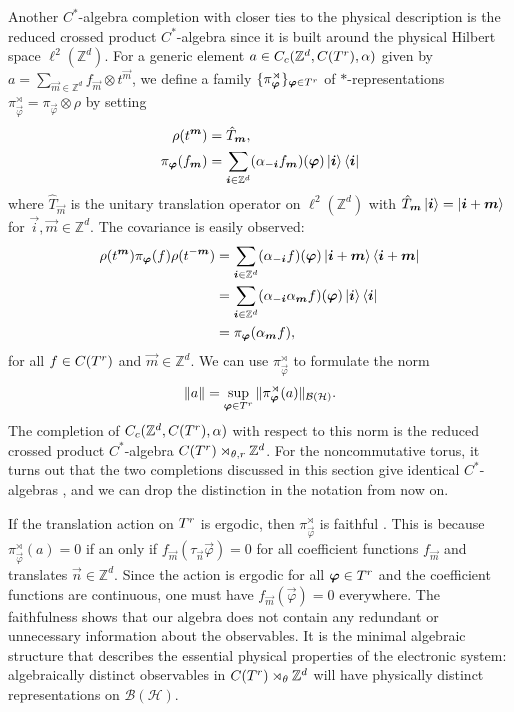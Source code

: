 \documentclass[submission, Phys]{SciPost}
\begin{document}
Another $C^\ast$-algebra completion with closer ties to the physical description is the reduced crossed product $C^\ast$-algebra since it is built around the physical Hilbert space $\ell^2(\mathbb{Z}^d)$.
For a generic element
$a\in C_c(\mathbb{Z}^d, C(T^r), \alpha )$
given by $a=\sum_{\vec{m} \in \mathbb{Z}^d} f_{\vec{m}} \otimes t^{\vec{m}}$,
we define a family $\lbrace \pi_{\boldsymbol{\varphi}}^\rtimes \rbrace_{\boldsymbol{\varphi}\in T^r} $
of $\ast$-representations $\pi_{\vec{\varphi}}^\rtimes = \pi_{\vec{\varphi}} \otimes \rho $ by setting
\begin{align}
    \rho(t^{\boldsymbol{m}}) &= \hat{T}_{\boldsymbol{m}},
    \\ 
    \pi_{\boldsymbol{\varphi}}(f_{\boldsymbol{m}})&=\sum_{\boldsymbol{i} \in \mathbb{Z}^{d}} (\alpha_{-\boldsymbol{i}}f_{\boldsymbol{m}})(\boldsymbol{\varphi})  \ket{\boldsymbol{i}}\bra{\boldsymbol{i}}
\end{align}
where $\hat{T}_{\vec{m}}$ is the unitary translation operator on $\ell^2(\mathbb{Z}^d)$ with $\hat{T}_{\boldsymbol{m}}\ket{\boldsymbol{i}}=\ket{\boldsymbol{i}+\boldsymbol{m}}$ for $\vec{i},\vec{m} \in \mathbb{Z}^d$.
The covariance is easily observed:
\begin{align}
\rho(t^{\boldsymbol{m}})\pi_{\boldsymbol{\varphi}}(f)\rho(t^{-\boldsymbol{m}})
&=\sum_{\boldsymbol{i} \in \mathbb{Z}^{d}} (\alpha_{-\boldsymbol{i}}f)(\boldsymbol{\varphi})  \ket{\boldsymbol{i}+\boldsymbol{m}}\bra{\boldsymbol{i}+\boldsymbol{m}}
\notag \\
&=\sum_{\boldsymbol{i} \in \mathbb{Z}^{d}} (\alpha_{-\boldsymbol{i}} \alpha_{\boldsymbol{m}} f)(\boldsymbol{\varphi})  \ket{\boldsymbol{i}}\bra{\boldsymbol{i}}
\notag \\
&=\pi_{\boldsymbol{\varphi}}(\alpha_{\boldsymbol{m}}f),
\end{align}
for all $f \in C(T^r)$ and $\vec{m} \in \mathbb{Z}^d$.
We can use $\pi_{\vec{\varphi}}^\rtimes$ to formulate the norm
\begin{equation}
    \| a \| = \sup_{\boldsymbol{\varphi}\in T^r} 
    \| \pi_{\boldsymbol{\varphi}}^\rtimes(a) \|_{\mathcal{B}(\mathcal{H})}.
\end{equation}
The completion of $C_c(\mathbb{Z}^d, C(T^r), \alpha )$ with respect to this norm is the reduced crossed product $C^\ast$-algebra $C(T^r)\rtimes_{\theta,r} \mathbb{Z}^d$.
For the noncommutative torus, it turns out that the two completions discussed in this section give identical $C^\ast$-algebras \cite[Thm.~7.13]{Williams2007}, and we can drop the distinction in the notation from now on.

If the translation action on $T^r$ is ergodic, then $\pi^\rtimes_{\vec{\varphi}}$ is faithful \cite[Prop.~3.8]{Prodan2017}.
This is because $\pi_{\vec{\varphi}}^\rtimes(a)=0$ if an only if $f_{\vec{m}}( \tau_{\vec{n}} \vec{\varphi} )=0$ for all coefficient functions $f_{\vec{m}}$ and translates $\vec{n} \in \mathbb{Z}^d$.
Since the action is ergodic for all $\boldsymbol{\varphi}\in T^r$ and the coefficient functions are continuous, one must have $f_{\vec{m}}( \vec{\varphi} )=0$ everywhere.
The faithfulness shows that our algebra does not contain any redundant or unnecessary information about the observables. It is the minimal algebraic structure that describes the essential physical properties of the electronic system: algebraically distinct observables in $C(T^r)\rtimes_{\theta} \mathbb{Z}^d$ will have physically distinct representations on $\mathcal{B}(\mathcal{H})$.
\end{document}
